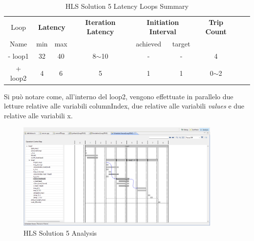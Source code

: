 \begin{table}[H]
	\centering
	\begin{tabular}{|c|c|c|c|c|c|c|c|c|}
		\hline
		\multicolumn{1}{|c|}{Loop} & \multicolumn{2}{|c|}{\textbf{Latency}} & \multicolumn{1}{c|}{\textbf{Iteration Latency}} & \multicolumn{2}{c|}{\textbf{Initiation Interval}} & \multicolumn{1}{c|}{\textbf{Trip Count}}  \\
		Name & min & max &  & achieved & target &  \\
		\hline
		- loop1 & 32 & 40 & 8$\sim$10 & - & - & 4 \\
		+ loop2 & 4 & 6 & 5 & 1 & 1 & 0$\sim$2 \\
		\hline
	\end{tabular}
	\caption{HLS Solution 5 Latency Loops Summary}
	\label{tab:hls-solution-5-loop-summary}
\end{table}

Si può notare come, all'interno del loop2, vengono effettuate in parallelo due letture relative alle variabili columnIndex, due relative alle variabili \textit{values} e due relative alle variabili x. 

\begin{figure}[H]
	\centering
	\includegraphics[width=0.9\textwidth]{solutions/s5/s5analysis.png}
	\caption{HLS Solution 5 Analysis}
\end{figure}

